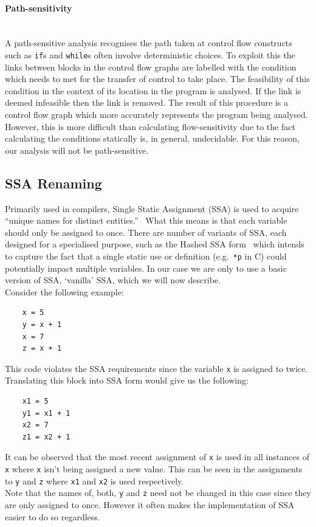 \documentclass[12pt, titlepage]{article}
\begin{document}
\paragraph*{Path-sensitivity}\mbox{} \\
A path-sensitive analysis recognises the path taken at control flow constructs such as \texttt{if}s and \texttt{while}s often involve deterministic choices. To exploit this the links between blocks in the control flow graphs are labelled with the condition which needs to met for the transfer of control to take place. The feasibility of this condition in the context of its location in the program is analysed. If the link is deemed infeasible then the link is removed. The result of this procedure is a control flow graph which more accurately represents the program being analysed. However, this is more difficult than calculating flow-sensitivity due to the fact calculating the conditions statically is, in general, undecidable. For this reason, our analysis will not be path-sensitive.

\subsection{SSA Renaming}
Primarily used in compilers, Single Static Assignment (SSA) is used to acquire ``unique names for distinct entities.''~\cite{ssaBook} What this means is that each variable should only be assigned to once. There are number of variants of SSA, each designed for a specialised purpose, such as the Hashed SSA form~\cite{ssaBook} which intends to capture the fact that a single static use or definition (e.g.\ \texttt{*p} in C) could potentially impact multiple variables. In our case we are only to use a basic version of SSA, `vanilla' SSA, which we will now describe. \\
Consider the following example:
\begin{lstlisting}
    x = 5
    y = x + 1
    x = 7
    z = x + 1
\end{lstlisting}
This code violates the SSA requirements since the variable \texttt{x} is assigned to twice. Translating this block into SSA form would give us the following:
\begin{lstlisting}
    x1 = 5
    y1 = x1 + 1
    x2 = 7
    z1 = x2 + 1
\end{lstlisting}
It can be observed that the most recent assignment of \texttt{x}  is used in all instances of \texttt{x} where \texttt{x} isn't being assigned a new value. This can be seen in the assignments to \texttt{y} and \texttt{z} where \texttt{x1} and \texttt{x2} is used respectively. \\
\indent Note that the names of, both, \texttt{y} and \texttt{z} need not be changed in this case since they are only assigned to once. However it often makes the implementation of SSA easier to do so regardless.
\end{document}
